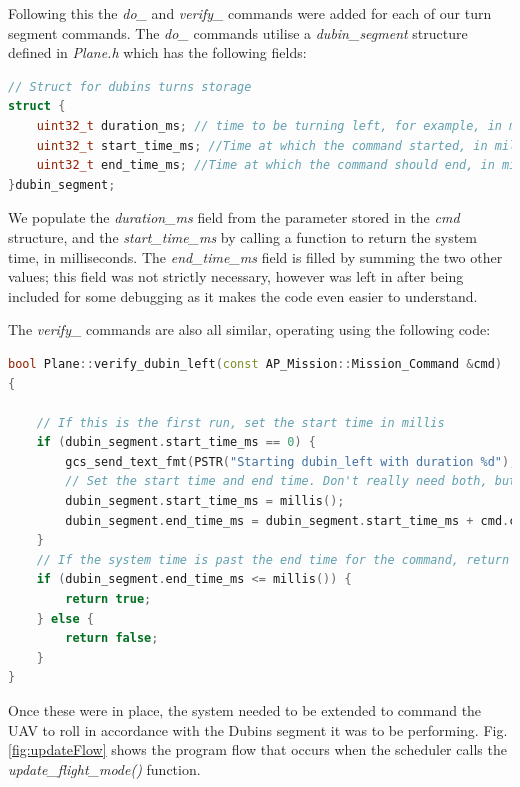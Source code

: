 Following this the \textit{do\_} and \textit{verify\_} commands were added for each of our turn segment commands. The \textit{do\_} commands utilise a \textit{dubin\_segment} structure defined in \textit{Plane.h} which has the following fields:

\begin{minipage}{\linewidth}
\begin{lstlisting}[language=C++]
// Struct for dubins turns storage
struct {
    uint32_t duration_ms; // time to be turning left, for example, in milliseconds
    uint32_t start_time_ms; //Time at which the command started, in milliseconds
    uint32_t end_time_ms; //Time at which the command should end, in milliseconds
}dubin_segment;
\end{lstlisting}
\end{minipage}

We populate the \textit{duration\_ms} field from the parameter stored in the \textit{cmd} structure, and the \textit{start\_time\_ms} by calling a function to return the system time, in milliseconds. The \textit{end\_time\_ms} field is filled by summing the two other values; this field was not strictly necessary, however was left in after being included for some debugging as it makes the code even easier to understand. 

The \textit{verify\_} commands are also all similar, operating using the following code:

\begin{minipage}{\linewidth}
\begin{lstlisting}[language=C++]
bool Plane::verify_dubin_left(const AP_Mission::Mission_Command &cmd)
{

    // If this is the first run, set the start time in millis
    if (dubin_segment.start_time_ms == 0) {
        gcs_send_text_fmt(PSTR("Starting dubin_left with duration %d"), dubin_segment.duration_ms);
        // Set the start time and end time. Don't really need both, but using for debugging
        dubin_segment.start_time_ms = millis();
        dubin_segment.end_time_ms = dubin_segment.start_time_ms + cmd.content.dubins.duration_ms;
    }
    // If the system time is past the end time for the command, return true
    if (dubin_segment.end_time_ms <= millis()) {
        return true;
    } else {
        return false;
    }
} 
\end{lstlisting}
\end{minipage}

Once these were in place, the system needed to be extended to command the UAV to roll in accordance with the Dubins segment it was to be performing. Fig. \ref{fig:updateFlow} shows the program flow that occurs when the scheduler calls the \textit{update\_flight\_mode()} function.

